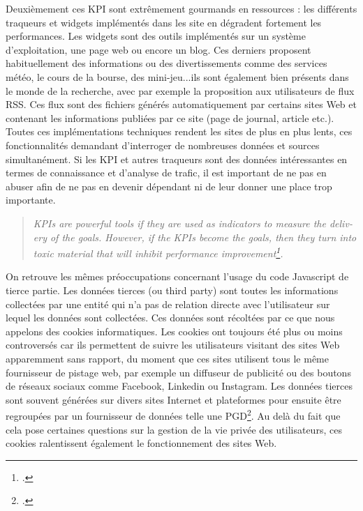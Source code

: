 \documentclass[a4paper,12pt,twoside]{book}
\begin{document}
Deuxièmement ces \acrshort{KPI} sont extrêmement gourmands en ressources : les différents traqueurs et widgets implémentés dans les site en dégradent fortement les performances. Les widgets sont des outils implémentés sur un système d'exploitation, une page web ou encore un blog. Ces derniers proposent habituellement des informations ou des divertissements comme des services météo, le cours de la bourse, des mini-jeu...ils sont également bien présents dans le monde de la recherche, avec par exemple la proposition aux utilisateurs de flux RSS. Ces flux sont des fichiers générés automatiquement par certains sites Web et contenant les informations publiées par ce site (page de journal, article etc.). Toutes ces implémentations techniques rendent les sites de plus en plus lents, ces fonctionnalités demandant d'interroger de nombreuses données et sources simultanément.
Si les \acrshort{KPI} et autres traqueurs sont des données intéressantes en termes de connaissance et d'analyse de trafic, il est important de ne pas en abuser afin de ne pas en devenir dépendant ni de leur donner une place trop importante. 
\begin{otherlanguage}{english}
\begin{quote}
    \textit{KPIs are powerful tools if they are used as indicators to measure the delivery of the goals. However, if the KPIs become the goals, then they turn into toxic material that will inhibit performance improvement\footcite{marr_caution_2021}.}
\end{quote}
\end{otherlanguage}


On retrouve les mêmes préoccupations concernant l'usage du code Javascript de tierce partie. Les données tierces (ou third party) sont toutes les informations collectées par une entité qui n'a pas de relation directe avec l'utilisateur sur lequel les données sont collectées. Ces données sont récoltées par ce que nous appelons des \og cookies \fg informatiques. Les cookies ont toujours été plus ou moins controversés car ils permettent de suivre les utilisateurs visitant des sites Web apparemment sans rapport, du moment que ces sites utilisent tous le même fournisseur de pistage web, par exemple un diffuseur de publicité ou des boutons de réseaux sociaux comme Facebook, Linkedin ou Instagram. Les données tierces sont souvent générées sur divers sites Internet et plateformes pour ensuite être regroupées par un fournisseur de données telle une \acrfull{PGD}\footcite{third_party}. Au delà du fait que cela pose certaines questions sur la gestion de la vie privée des utilisateurs, ces cookies ralentissent également le fonctionnement des sites Web.
\end{document}
